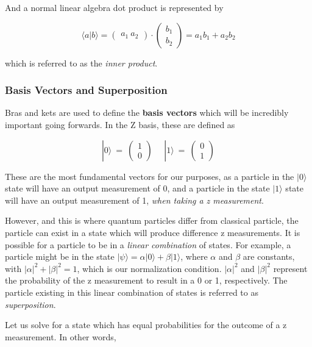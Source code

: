 \documentclass[11pt]{article}
\begin{document}
And a normal linear algebra dot product is represented by

\[\langle a | b \rangle = \begin{pmatrix} a_1 \ a_2 \end{pmatrix} \cdot \begin{pmatrix} b_1 \\ b_2 \end{pmatrix} = a_1b_1 + a_2b_2\]

which is referred to as the \emph{inner product}.

    \subsubsection{Basis Vectors and
Superposition}\label{basis-vectors-and-superposition}

    Bras and kets are used to define the \textbf{basis vectors} which will
be incredibly important going forwards. In the Z basis, these are
defined as

\[|0\rangle \ = \ \begin{pmatrix} 1 \\ 0 \end{pmatrix} \ \ \ \ \ \ |1\rangle \ = \ \begin{pmatrix} 0 \\ 1 \end{pmatrix}\]

These are the most fundamental vectors for our purposes, as a particle
in the \(|0\rangle\) state will have an output measurement of 0, and a
particle in the state \(|1\rangle\) state will have an output
measurement of 1, \emph{when taking a z measurement}.

However, and this is where quantum particles differ from classical
particle, the particle can exist in a state which will produce
difference z measurements. It is possible for a particle to be in a
\emph{linear combination} of states. For example, a particle might be in
the state \(|\psi\rangle = \alpha|0\rangle + \beta|1\rangle\), where
\(\alpha\) and \(\beta\) are constants, with
\(|\alpha|^2 + |\beta|^2 = 1\), which is our normalization condition.
\(|\alpha|^2\) and \(|\beta|^2\) represent the probability of the z
measurement to result in a 0 or 1, respectively. The particle existing
in this linear combination of states is referred to as
\emph{superposition}.

Let us solve for a state which has equal probabilities for the outcome
of a z measurement. In other words,
\end{document}
